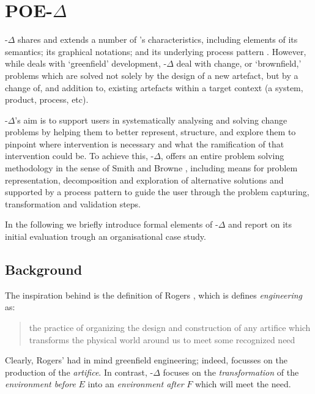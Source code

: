 \documentclass[runningheads,a4paper]{llncs}
\begin{document}
\section{POE-$\Delta$}
\label{sect:POEDelta}
\POE{}-$\Delta$ shares and extends a number of \POE{}'s characteristics, including elements of its semantics; its graphical notations; and its underlying process pattern \cite{Hall2009JAdvSysMeas}. However, while \POE{} deals with `greenfield' development, \POE{}-$\Delta$ deal with change, or  `brownfield,' problems which are solved not solely by the design of a new artefact, but by a change of, and addition to, existing artefacts within a target context (a system, product, process, etc).

\POE{}-$\Delta$'s aim is to support users in systematically analysing and solving change problems by helping them to better represent, structure, and explore them to pinpoint where intervention is necessary and what the ramification of that intervention could be. To achieve this, \POE{}-$\Delta$, offers an entire problem solving methodology in the sense of Smith and Browne \cite{smith1993conceptual}, including means for problem representation, decomposition and exploration of alternative solutions and supported by a process pattern to guide the user through the problem capturing, transformation and validation steps.

In the following we briefly introduce formal elements of \POE{}-$\Delta$ and report on its initial evaluation trough an organisational case study.

\subsection{Background}
\label{theory}

The inspiration behind \POE{} is the definition of Rogers \cite{rogers1983nature}, which is defines \textit{engineering} as:
%
\begin{quotation}
 the practice of organizing the design and construction of any artifice which transforms the physical world around us to meet some recognized need 
\end{quotation}
%
Clearly, Rogers' had in mind greenfield engineering; indeed, \POE{} focusses on the production of the \textit{artifice}. In contrast, \POE{}-$\Delta$ focuses on the \textit{transformation} of the \textit{environment before} $E$ into an \textit{environment after} $F$ which will meet the need.
\end{document}
